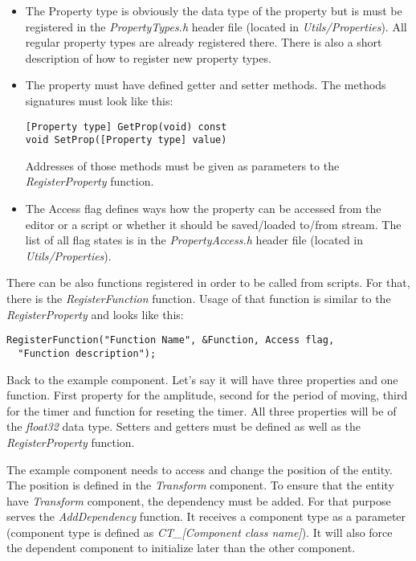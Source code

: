 \documentclass[a4paper, 12pt]{report}
\begin{document}
\begin{itemize}
\item
The Property type is obviously the data type of the property but is must be registered in the \emph{PropertyTypes.h} header file (located in \emph{Utils/Properties}). All regular property types are already registered there. There is also a short description of how to register new property types.

\item
The property must have defined getter and setter methods. The methods signatures must look like this:

\footnotesize 
\begin{verbatim}
[Property type] GetProp(void) const
void SetProp([Property type] value)
\end{verbatim}
\normalsize

Addresses of those methods must be given as parameters to the \emph{RegisterProperty} function.

\item
The Access flag defines ways how the property can be accessed from the editor or a script or whether it should be saved/loaded to/from stream. The list of all flag states is in the \emph{PropertyAccess.h} header file (located in \emph{Utils/Properties}).
\end{itemize}

There can be also functions registered in order to be called from scripts. For that, there is the \emph{RegisterFunction} function. Usage of that function is similar to the \emph{RegisterProperty} and looks like this:

\footnotesize 
\begin{verbatim}
RegisterFunction("Function Name", &Function, Access flag,
  "Function description");
\end{verbatim}
\normalsize

Back to the example component. Let's say it will have three properties and one function. First property for the amplitude, second for the period of moving, third for the timer and function for reseting the timer. All three properties will be of the \emph{float32} data type. Setters and getters must be defined as well as the \emph{RegisterProperty} function. 

The example component needs to access and change the position of the entity. The position is defined in the \emph{Transform} component. To ensure that the entity have \emph{Transform} component, the dependency must be added. For that purpose serves the \emph{AddDependency} function. It receives a component type as a parameter (component type is defined as \emph{CT\_[Component class name]}). It will also force the dependent component to initialize later than the other component.
\end{document}
